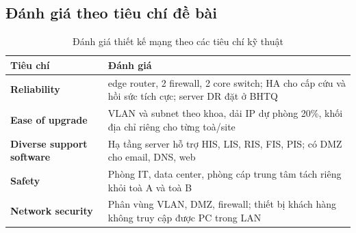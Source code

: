 \subsection{Đánh giá theo tiêu chí đề bài}
\begin{table}[H]
    \centering
    \small
    \renewcommand{\arraystretch}{1.4}
    \begin{tabularx}{\textwidth}{
        @{}
        >{\raggedright\arraybackslash}p{4cm}
        >{\raggedright\arraybackslash}X
        @{}
    }
        \toprule
        \textbf{Tiêu chí} & \textbf{Đánh giá} \\
        \midrule
        \textbf{Reliability}
        & 2 edge router, 2 firewall, 2 core switch; HA cho cấp cứu và hồi sức tích cực; server DR đặt ở BHTQ \\

        \textbf{Ease of upgrade}
        & VLAN và subnet theo khoa, dải IP dự phòng 20\%, khối địa chỉ riêng cho từng toà/site \\

        \textbf{Diverse support software}
        & Hạ tầng server hỗ trợ HIS, LIS, RIS, FIS, PIS; có DMZ cho email, DNS, web \\

        \textbf{Safety}
        & Phòng IT, data center, phòng cáp trung tâm tách riêng khỏi toà A và toà B \\

        \textbf{Network security}
        & Phân vùng VLAN, DMZ, firewall; thiết bị khách hàng không truy cập được PC trong LAN \\
        \bottomrule
    \end{tabularx}
    \caption{Đánh giá thiết kế mạng theo các tiêu chí kỹ thuật}
\end{table}

